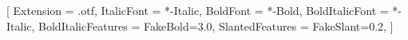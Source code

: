 \usepackage[margin=2.0cm,a5paper]{geometry}
\usepackage{fontspec}
\usepackage{graphicx}
\usepackage[greek,english,portuges]{babel}   %
\usepackage{indentfirst}

\setmainfont{QTBodini}[
    Extension               = .otf,
    ItalicFont              = *-Italic,
    BoldFont                = *-Bold,
    BoldItalicFont          = *-Italic,
    BoldItalicFeatures      = {FakeBold=3.0},
    SlantedFeatures         = {FakeSlant=0.2},
]


